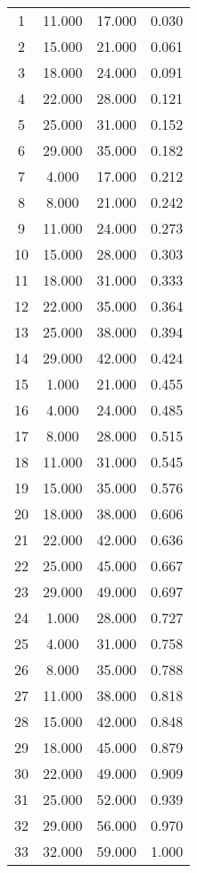 % 
\begin{tabular}{cccc}
  \hline
  \hline
1 & 11.000 & 17.000 & 0.030 \\ 
  2 & 15.000 & 21.000 & 0.061 \\ 
  3 & 18.000 & 24.000 & 0.091 \\ 
  4 & 22.000 & 28.000 & 0.121 \\ 
  5 & 25.000 & 31.000 & 0.152 \\ 
  6 & 29.000 & 35.000 & 0.182 \\ 
  7 & 4.000 & 17.000 & 0.212 \\ 
  8 & 8.000 & 21.000 & 0.242 \\ 
  9 & 11.000 & 24.000 & 0.273 \\ 
  10 & 15.000 & 28.000 & 0.303 \\ 
  11 & 18.000 & 31.000 & 0.333 \\ 
  12 & 22.000 & 35.000 & 0.364 \\ 
  13 & 25.000 & 38.000 & 0.394 \\ 
  14 & 29.000 & 42.000 & 0.424 \\ 
  15 & 1.000 & 21.000 & 0.455 \\ 
  16 & 4.000 & 24.000 & 0.485 \\ 
  17 & 8.000 & 28.000 & 0.515 \\ 
  18 & 11.000 & 31.000 & 0.545 \\ 
  19 & 15.000 & 35.000 & 0.576 \\ 
  20 & 18.000 & 38.000 & 0.606 \\ 
  21 & 22.000 & 42.000 & 0.636 \\ 
  22 & 25.000 & 45.000 & 0.667 \\ 
  23 & 29.000 & 49.000 & 0.697 \\ 
  24 & 1.000 & 28.000 & 0.727 \\ 
  25 & 4.000 & 31.000 & 0.758 \\ 
  26 & 8.000 & 35.000 & 0.788 \\ 
  27 & 11.000 & 38.000 & 0.818 \\ 
  28 & 15.000 & 42.000 & 0.848 \\ 
  29 & 18.000 & 45.000 & 0.879 \\ 
  30 & 22.000 & 49.000 & 0.909 \\ 
  31 & 25.000 & 52.000 & 0.939 \\ 
  32 & 29.000 & 56.000 & 0.970 \\ 
  33 & 32.000 & 59.000 & 1.000 \\ 
   \hline
\end{tabular}
